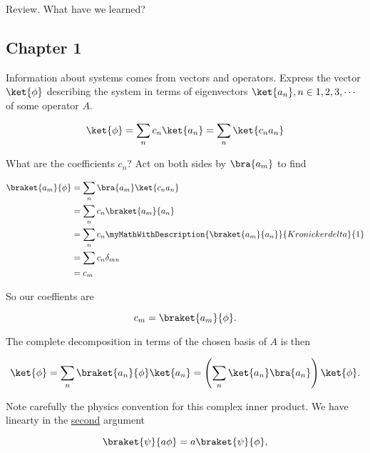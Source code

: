 %
%

Review.  What have we learned?

\subsection{Chapter 1}
Information about systems comes from vectors and operators.  Express the vector $\ket{\phi}$ describing the system in terms of eigenvectors $\ket{a_n}, n \in 1,2,3,\cdots$ of some operator $A$.

\begin{equation}\label{eqn:PHY356FLecture10:51}
\ket{\phi} = \sum_n c_n \ket{a_n} = \sum_n \ket{c_n a_n}
\end{equation}

What are the coefficients $c_n$?  Act on both sides by $\bra{a_m}$ to find

\begin{align*}
\braket{a_m}{\phi}
&= \sum_n \bra{a_m} \ket{ c_n a_n } \\
&= \sum_n c_n \braket{a_m}{ a_n } \\
&= \sum_n c_n \myMathWithDescription{\braket{a_m}{a_n}}{Kronicker delta}{1}  \\
&= \sum c_n \delta_{mn} \\
&= c_m
\end{align*}

So our coeffients are

\begin{equation}\label{eqn:PHY356FLecture10:51c}
c_m = \braket{a_m}{\phi}.
\end{equation}

The complete decomposition in terms of the chosen basis of $A$ is then

\begin{equation}\label{eqn:PHY356FLecture10:51b}
\ket{\phi} = \sum_n \braket{a_n}{\phi} \ket{a_n}
= \left( \sum_n \ket{a_n} \bra{a_n} \right) \ket{\phi}.
\end{equation}

Note carefully the physics convention for this complex inner product.  We have linearty in the \underline{second} argument

\begin{equation}\label{eqn:PHY356FLecture10:51e}
\braket{\psi}{a \phi} = a \braket{\psi}{\phi},
\end{equation}

